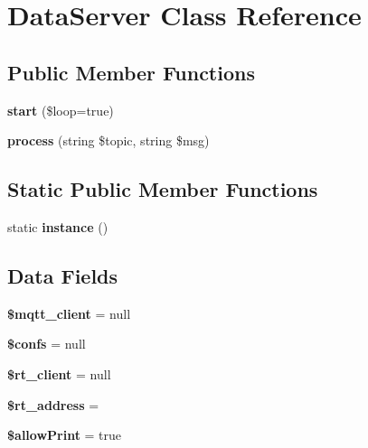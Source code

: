 \hypertarget{class_data_server}{}\section{Data\+Server Class Reference}
\label{class_data_server}
\subsection*{Public Member Functions}
\begin{DoxyCompactItemize}
\item 
\mbox{\label{class_data_server_a922cf1a28bbdfbd049f6bcc8c57039c2}} 
{\bfseries start} (\$loop=true)
\item 
\mbox{\label{class_data_server_acf279a7b53dd92327b68f3b3f376ee2f}} 
{\bfseries process} (string \$topic, string \$msg)
\end{DoxyCompactItemize}
\subsection*{Static Public Member Functions}
\begin{DoxyCompactItemize}
\item 
\mbox{\label{class_data_server_a0deb004950b8dc4f51836316fd19c111}} 
static {\bfseries instance} ()
\end{DoxyCompactItemize}
\subsection*{Data Fields}
\begin{DoxyCompactItemize}
\item 
\mbox{\label{class_data_server_a5946274cba635d6d4e49d93b66aa1964}} 
{\bfseries \$mqtt\+\_\+client} = null
\item 
\mbox{\label{class_data_server_a95787ffe38852d43a64a75d95f5feb88}} 
{\bfseries \$confs} = null
\item 
\mbox{\label{class_data_server_af213a81daaf386c089bb36f148cfbd96}} 
{\bfseries \$rt\+\_\+client} = null
\item 
\mbox{\label{class_data_server_a721b31e1995c24214da0e89eb5ec3100}} 
{\bfseries \$rt\+\_\+address} = \textquotesingle{}\textquotesingle{}
\item 
\mbox{\label{class_data_server_aaf8416d215d1e9710dfe026490c998dc}} 
{\bfseries \$allow\+Print} = true
\end{DoxyCompactItemize}

